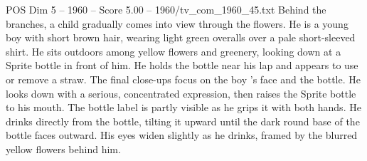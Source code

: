 \begin{textsample}{POS Dim 5 – 1960 – Score 5.00 – 1960/tv\_com\_1960\_45.txt}
Behind the branches, a child gradually comes into view through the flowers.
He is a young boy with short brown hair, wearing light green overalls over a pale short-sleeved shirt.
He sits outdoors among yellow flowers and greenery, looking down at a Sprite bottle in front of him.
He holds the bottle near his lap and appears to use or remove a straw.
The final close-ups focus on the boy ’s face and the bottle.
He looks down with a serious, concentrated expression, then raises the Sprite bottle to his mouth.
The bottle label is partly visible as he grips it with both hands.
He drinks directly from the bottle, tilting it upward until the dark round base of the bottle faces outward.
His eyes widen slightly as he drinks, framed by the blurred yellow flowers behind him.

\end{textsample}
